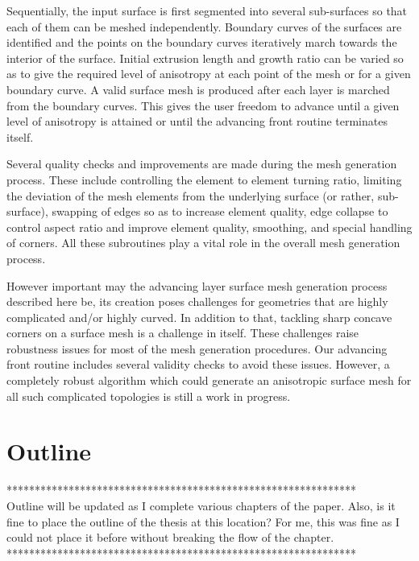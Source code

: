 Sequentially, the input surface is first segmented into several sub-surfaces so that each of them can be meshed independently. Boundary curves of the surfaces are identified and the points on the boundary curves iteratively march towards the interior of the surface. Initial extrusion length and growth ratio can be varied so as to give the required level of anisotropy at each point of the mesh or for a given boundary curve. A valid surface mesh is produced after each layer is marched from the boundary curves. This gives the user freedom to advance until a given level of anisotropy is attained or until the advancing front routine terminates itself. 

Several quality checks and improvements are made during the mesh generation process. These include controlling the element to element turning ratio, limiting the deviation of the mesh elements from the underlying surface (or rather, sub-surface), swapping of edges so as to increase element quality, edge collapse to control aspect ratio and improve element quality, smoothing, and special handling of corners. All these subroutines play a vital role in the overall mesh generation process.

However important may the advancing layer surface mesh generation process described here be, its creation poses challenges for geometries that are highly complicated and/or highly curved. In addition to that, tackling sharp concave corners on a surface mesh is a challenge in itself. These challenges raise robustness issues for most of the mesh generation procedures. Our advancing front routine includes several validity checks to avoid these issues. However, a completely robust algorithm which could generate an anisotropic surface mesh for all such complicated topologies is still a work in progress.

\section{Outline}

************************************************************** \\
Outline will be updated as I complete various chapters of the paper.
Also, is it fine to place the outline of the thesis at this location? For me, this was fine as I could not place it before without breaking the flow of the chapter. \\
**************************************************************

